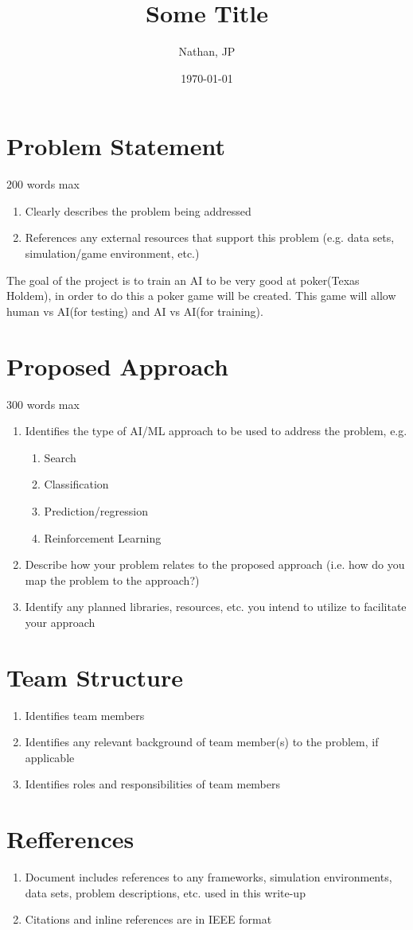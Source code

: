 \documentclass[11pt]{article}
\title{Some Title}
\author{Nathan, JP}
\date{\today}
\begin{document}
\maketitle
\section{Problem Statement}
200 words max
\begin{enumerate}
\item Clearly describes the problem being addressed
\item References any external resources that support this problem (e.g. data sets, simulation/game environment,
  etc.)
\end{enumerate}

The goal of the project is to train an AI to be very good at poker(Texas Holdem), in order to do this a poker
game will be created. This game will allow human vs AI(for testing) and AI vs AI(for training).

\section{Proposed Approach}
300 words max
\begin{enumerate}
\item Identifies the type of AI/ML approach to be used to address the problem, e.g.
  \begin{enumerate}
  \item Search
  \item Classification
  \item Prediction/regression
  \item Reinforcement Learning
  \end{enumerate}
\item Describe how your problem relates to the proposed approach (i.e. how do you map the problem to the
  approach?)
\item Identify any planned libraries, resources, etc. you intend to utilize to facilitate your approach
\end{enumerate}

\section{Team Structure}
\begin{enumerate}
\item Identifies team members
\item Identifies any relevant background of team member(s) to the problem, if applicable
\item Identifies roles and responsibilities of team members
\end{enumerate}

\section{Refferences}
\begin{enumerate}
\item Document includes references to any frameworks, simulation environments, data sets, problem descriptions,
  etc. used in this write-up
\item Citations and inline references are in IEEE format
\end{enumerate}
\end{document}
